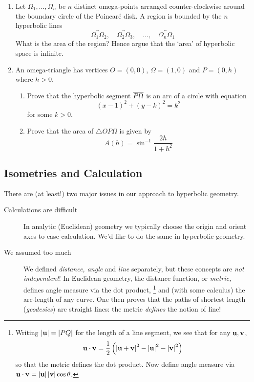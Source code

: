 \begin{exercises}
\begin{enumerate}
		\item Let $\Omega_1,\ldots,\Omega_n$ be $n$ distinct omega-points arranged counter-clockwise around the boundary circle of the Poincaré disk. A region is bounded by the $n$ hyperbolic lines
		\[
			\overleftrightarrow{\Omega_1\Omega_2},\quad \overleftrightarrow{\Omega_2\Omega_3},\quad\ldots,\quad\overleftrightarrow{\Omega_n\Omega_1}
		\]
		What is the area of the region? Hence argue that the `area' of hyperbolic space is infinite.
	  
	  \item An omega-triangle has vertices $O=(0,0)$, $\Omega=(1,0)$ and $P=(0,h)$ where $h>0$.
	  \begin{enumerate}
	    \item Prove that the hyperbolic segment $\overline{P\Omega}$ is an arc of a circle with equation
	    \[
	    	(x-1)^2+(y-k)^2=k^2
	    \]
	    for some $k>0$.
	    \item Prove that the area of $\triangle OP\Omega$ is given by
			\[
				A(h)=\sin^{-1}\dfrac{2h}{1+h^2}
			\]
		\end{enumerate}
	
	\end{enumerate}
\end{exercises}

\clearpage




\subsection{Isometries and Calculation}\label{sec:hyperiso}

There are (at least!) two major issues in our approach to hyperbolic geometry.

\begin{description}
	\item[Calculations are difficult] In analytic (Euclidean) geometry we typically choose the origin and orient axes to ease calculation. We'd like to do the same in hyperbolic geometry.
	\item[We assumed too much] We defined \emph{distance, angle} and \emph{line} separately, but these concepts are \emph{not independent}! In Euclidean geometry, the distance function, or \emph{metric,} defines angle measure via the dot product,%
	\footnote{%
		Writing $\left| {\mathbf{u}}\right|=\left| PQ\right|$ for the length of a line segment, we see that for any ${\mathbf{u}},{\mathbf{v}}$,
		\[
			{\mathbf{u}}\cdot{\mathbf{v}}=\frac 12\left(\left| {\mathbf{u}}+{\mathbf{v}}\right|^2-\left| {\mathbf{u}}\right|^2-\left| {\mathbf{v}}\right|^2\right)
		\]
		so that the metric defines the dot product. Now define angle measure via ${\mathbf{u}}\cdot{\mathbf{v}}=\left| {\mathbf{u}}\right|\left| {\mathbf{v}}\right|\cos\theta$.
	}%
	and (with some calculus) the arc-length of any curve. One then proves that the paths of shortest length (\emph{geodesics}) are straight lines: the metric \emph{defines} the notion of line!
\end{description}

